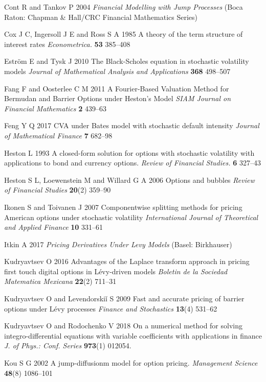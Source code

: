 \documentclass[a4paper]{jpconf}
\begin{document}
{\begin{thebibliography}{22}
 Cont R and Tankov P 2004 {\it Financial Modelling with Jump Processes} (Boca Raton: Chapman \& Hall/CRC Financial Mathematics Series)

 Cox J C, Ingersoll J E and Ross S A 1985 A theory of the term structure of interest rates  {\it Econometrica.} {\bf 53} 385--408

 Estr\"om E and Tysk J 2010 The Black-Scholes equation in stochastic volatility models {\it Journal of Mathematical Analysis and Applications} {\bf 368} 498--507

 Fang F and Oosterlee C M 2011 A Fourier-Based Valuation Method for Bermudan and Barrier Options under Heston's Model {\it SIAM Journal on Financial Mathematics} {\bf 2} 439--63

 Feng Y Q 2017 CVA under Bates model with stochastic default intensity {\it Journal of Mathematical Finance} {\bf 7} 682--98

 Heston L 1993 A closed-form solution for options with stochastic volatility with applications to bond and currency options. {\it Review of Financial Studies.} {\bf 6} 327--43

 Heston S L, Loewenstein M and Willard G A 2006 Options and bubbles {\it Review of Financial Studies} {\bf 20}(2) 359--90

 Ikonen S and Toivanen J 2007 Componentwise splitting methods for pricing American options under stochastic volatility {\it International Journal of Theoretical and Applied Finance} {\bf 10} 331--61

 Itkin A 2017 {\it Pricing Derivatives Under Levy Models} (Basel: Birkhauser)
 
 Kudryavtsev O 2016 Advantages of the Laplace transform approach in pricing first touch digital options in L\'evy-driven models {\it Boletin de la Sociedad Matematica Mexicana} {\bf 22}(2) 711--31

 Kudryavtsev O and Levendorski\v{i} S 2009 Fast and accurate pricing of barrier options under L\'evy processes {\it Finance and Stochastics} {\bf 13}(4) 531--62

 Kudryavtsev O and Rodochenko V 2018 On a numerical method for solving integro-differential equations with variable coefficients with applications in finance {\it J. of Phys.: Conf. Series} {\bf 973}(1) 012054.

 Kou S G 2002 A jump-diffusionm model for option pricing. {\it Management Science} {\bf 48}(8) 1086--101 


\end{thebibliography}}
\end{document}
